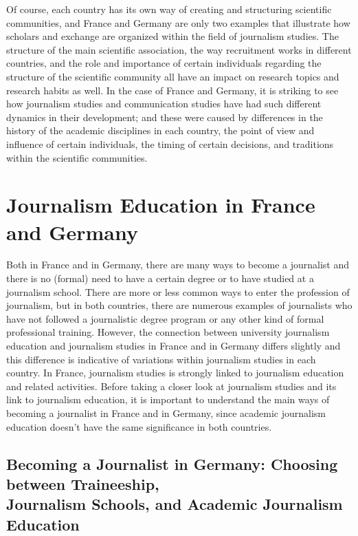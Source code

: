 \documentclass{tufte-handout}
\begin{document}
Of course, each country has its own way of creating and structuring
scientific communities, and France and Germany are only two examples
that illustrate how scholars and exchange are organized within the field
of journalism studies. The structure of the main scientific association,
the way recruitment works in different countries, and the role and
importance of certain individuals regarding the structure of the
scientific community all have an impact on research topics and research
habits as well. In the case of France and Germany, it is striking to see
how journalism studies and communication studies have had such different
dynamics in their development; and these were caused by differences in
the history of the academic disciplines in each country, the point of
view and influence of certain individuals, the timing of certain
decisions, and traditions within the scientific communities.

\hypertarget{journalism-education-in-france-and-germany}{%
\section{Journalism Education in France and
Germany}\label{journalism-education-in-france-and-germany}}

Both in France and in Germany, there are many ways to become a
journalist and there is no (formal) need to have a certain degree or to
have studied at a journalism school. There are more or less common ways
to enter the profession of journalism, but in both countries, there are
numerous examples of journalists who have not followed a journalistic
degree program or any other kind of formal professional training.
However, the connection between university journalism education and
journalism studies in France and in Germany differs slightly and this
difference is indicative of variations within journalism studies in each
country. In France, journalism studies is strongly linked to journalism
education and related activities. Before taking a closer look at
journalism studies and its link to journalism education, it is important
to understand the main ways of becoming a journalist in France and in
Germany, since academic journalism education doesn't have the same
significance in both countries.

\hypertarget{becoming-a-journalist-in-germany-choosing-between-traineeship-journalism-schools-and-academic-journalism-education}{%
\subsection{Becoming a Journalist in Germany:
Choosing between Traineeship,\\\noindent Journalism Schools, and Academic
Journalism
Education}\label{becoming-a-journalist-in-germany-choosing-between-traineeship-journalism-schools-and-academic-journalism-education}}
\end{document}
